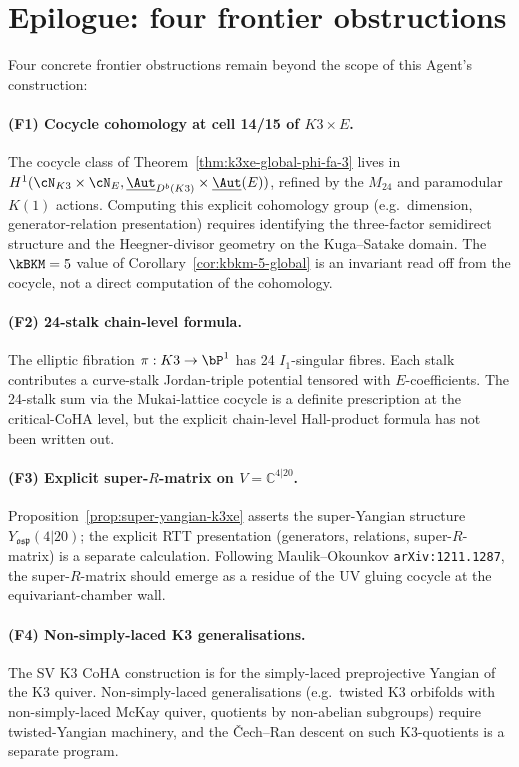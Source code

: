 \section{Epilogue: four frontier obstructions}

Four concrete frontier obstructions remain beyond the scope of this
Agent's construction:

\paragraph{(F1) Cocycle cohomology at cell 14/15 of $K3 \times E$.}
The cocycle class of Theorem~\ref{thm:k3xe-global-phi-fa-3} lives in
$H^1(\cN_{K3} \times \cN_E, \underline{\Aut}_{D^b(K3)} \times
\underline{\Aut}(E))$, refined by the $M_{24}$ and paramodular
$K(1)$ actions. Computing this explicit cohomology group (e.g.\
dimension, generator-relation presentation) requires identifying
the three-factor semidirect structure and the Heegner-divisor
geometry on the Kuga--Satake domain. The $\kBKM = 5$ value of
Corollary~\ref{cor:kbkm-5-global} is an invariant read off from
the cocycle, not a direct computation of the cohomology.

\paragraph{(F2) 24-stalk chain-level formula.} The elliptic
fibration $\pi: K3 \to \bP^1$ has 24 $I_1$-singular fibres. Each
stalk contributes a curve-stalk Jordan-triple potential tensored
with $E$-coefficients. The 24-stalk sum via the Mukai-lattice cocycle
is a definite prescription at the critical-CoHA level, but the
explicit chain-level Hall-product formula has not been written out.

\paragraph{(F3) Explicit super-$R$-matrix on $V = \mathbb{C}^{4|20}$.}
Proposition~\ref{prop:super-yangian-k3xe} asserts the super-Yangian
structure $Y_{\mathfrak{osp}}(4|20)$; the explicit RTT presentation
(generators, relations, super-$R$-matrix) is a separate calculation.
Following Maulik--Okounkov \texttt{arXiv:1211.1287}, the
super-$R$-matrix should emerge as a residue of the UV gluing cocycle
at the equivariant-chamber wall.

\paragraph{(F4) Non-simply-laced K3 generalisations.} The SV K3 CoHA
construction is for the simply-laced preprojective Yangian of the K3
quiver. Non-simply-laced generalisations (e.g.\ twisted K3
orbifolds with non-simply-laced McKay quiver, quotients by
non-abelian subgroups) require twisted-Yangian machinery, and the
Čech--Ran descent on such K3-quotients is a separate program.

